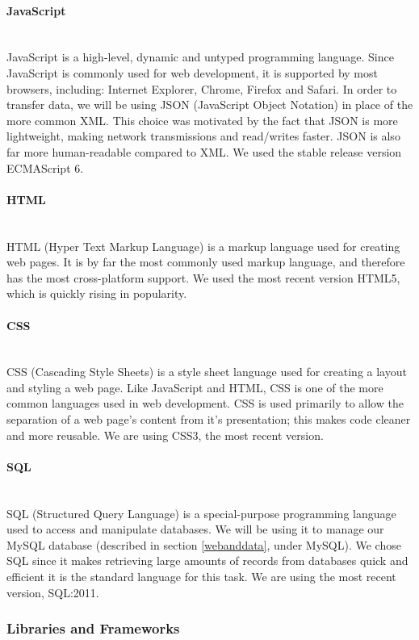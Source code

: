 \documentclass[12pt]{article}
\begin{document}
\paragraph*{JavaScript}~\\
JavaScript is a high-level, dynamic and untyped programming language. Since JavaScript is commonly used for web development, it is supported by most browsers, including: Internet Explorer, Chrome, Firefox and Safari. In order to transfer data, we will be using JSON (JavaScript Object Notation) in place of the more common XML. This choice was motivated by the fact that JSON is more lightweight, making network transmissions and read/writes faster. JSON is also far more human-readable compared to XML. We used the stable release version ECMAScript 6.
%
\paragraph*{HTML}~\\
HTML (Hyper Text Markup Language) is a markup language used for creating web pages. It is by far the most commonly used markup language, and therefore has the most cross-platform support. We used the most recent version HTML5, which is quickly rising in popularity. 
%
\paragraph*{CSS}~\\
CSS (Cascading Style Sheets) is a style sheet language used for creating a layout and styling a web page. Like JavaScript and HTML, CSS is one of the more common languages used in web development. CSS is used primarily to allow the separation of a web page's content from it's presentation; this makes code cleaner and more reusable. We are using CSS3, the most recent version.
%
\paragraph*{SQL}~\\
SQL (Structured Query Language) is a special-purpose programming language used to access and manipulate databases. We will be using it to manage our MySQL database (described in section \ref{webanddata}, under MySQL). We chose SQL since it makes retrieving large amounts of records from databases quick and efficient it is the standard language for this task. We are using the most recent version, SQL:2011.
%
%
%
\subsubsection{Libraries and Frameworks}\label{framworks}
\end{document}

